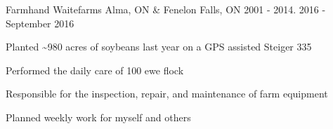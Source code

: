 \begin{cventries}
  \cventry
    {Farmhand} %
    {Waitefarms} %
    {Alma, ON \& Fenelon Falls, ON}
    {2001 - 2014. 2016 - September 2016} %
    {
      \begin{cvitems} %
        \item {Planted \textasciitilde980 acres of soybeans last year on a GPS assisted Steiger 335}
        \item {Performed the daily care of 100 ewe flock}
        \item {Responsible for the inspection, repair, and maintenance of farm equipment}
        \item {Planned weekly work for myself and others}
      \end{cvitems}
    }

\end{cventries}
